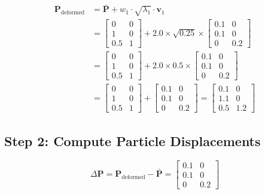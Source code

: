 \documentclass[12pt,a4paper]{article}
\begin{document}
\begin{align}
\mathbf{P}_{\text{deformed}} &= \bar{\mathbf{P}} + w_1 \cdot \sqrt{\lambda_1} \cdot \mathbf{v}_1 \\[0.5em]
&= \begin{bmatrix} 0 & 0 \\ 1 & 0 \\ 0.5 & 1 \end{bmatrix} + 2.0 \times \sqrt{0.25} \times \begin{bmatrix} 0.1 & 0 \\ 0.1 & 0 \\ 0 & 0.2 \end{bmatrix} \\[0.5em]
&= \begin{bmatrix} 0 & 0 \\ 1 & 0 \\ 0.5 & 1 \end{bmatrix} + 2.0 \times 0.5 \times \begin{bmatrix} 0.1 & 0 \\ 0.1 & 0 \\ 0 & 0.2 \end{bmatrix} \\[0.5em]
&= \begin{bmatrix} 0 & 0 \\ 1 & 0 \\ 0.5 & 1 \end{bmatrix} + \begin{bmatrix} 0.1 & 0 \\ 0.1 & 0 \\ 0 & 0.2 \end{bmatrix} = \begin{bmatrix} 0.1 & 0 \\ 1.1 & 0 \\ 0.5 & 1.2 \end{bmatrix}
\end{align}

\subsection{Step 2: Compute Particle Displacements}

\begin{equation}
\Delta \mathbf{P} = \mathbf{P}_{\text{deformed}} - \bar{\mathbf{P}} = \begin{bmatrix} 0.1 & 0 \\ 0.1 & 0 \\ 0 & 0.2 \end{bmatrix}
\end{equation}
\end{document}
